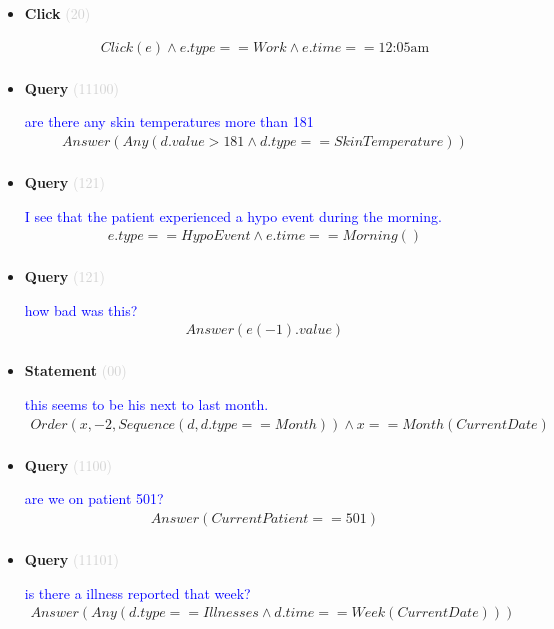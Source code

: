 \documentclass[11pt]{article}
\newcommand{\key}[1]{\textcolor{lightgray}{#1}}
\newcounter{CQuery}
\newcounter{CStatement}
\newcounter{CClick}
\begin{document}
\begin{itemize}
\item
\textbf{Click\theCClick} \key{(20)} \addtocounter{CClick}{1}
\textcolor{blue}{  }
\begin{multline*}
Click(e) \wedge e.type==Work \wedge e.time==\mbox{12:05am} \\ 
\end{multline*}


\item
\textbf{Query\theCQuery} \key{(11100)} \addtocounter{CQuery}{1}
\textcolor{blue}{ are there any skin temperatures more than 181 }
\begin{multline*}
Answer(Any(d.value>181 \wedge d.type==SkinTemperature)) \\ 
\end{multline*}


\item
\textbf{Query\theCQuery} \key{(121)} \addtocounter{CQuery}{1}
\textcolor{blue}{ I see that the patient experienced a hypo event during the morning. }
\begin{multline*}
e.type==HypoEvent \wedge e.time==Morning() \\ 
\end{multline*}


\item
\textbf{Query\theCQuery} \key{(121)} \addtocounter{CQuery}{1}
\textcolor{blue}{ how bad was this? }
\begin{multline*}
Answer(e(-1).value) \\ 
\end{multline*}


\item
\textbf{Statement\theCStatement} \key{(00)} \addtocounter{CStatement}{1}
\textcolor{blue}{ this seems to be his next to last month. }
\begin{multline*}
Order(x, -2, Sequence(d, d.type==Month)) \wedge x==Month(CurrentDate) \\ 
\end{multline*}


\item
\textbf{Query\theCQuery} \key{(1100)} \addtocounter{CQuery}{1}
\textcolor{blue}{ are we on patient 501? }
\begin{multline*}
Answer(CurrentPatient==501) \\ 
\end{multline*}


\item
\textbf{Query\theCQuery} \key{(11101)} \addtocounter{CQuery}{1}
\textcolor{blue}{ is there a illness reported that week? }
\begin{multline*}
Answer(Any(d.type==Illnesses \wedge d.time==Week(CurrentDate))) \\ 
\end{multline*}



\end{itemize}
\end{document}
